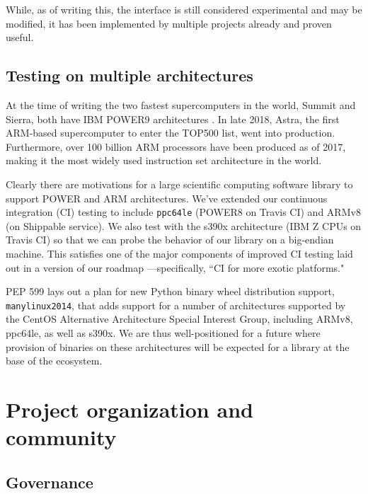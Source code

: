 \documentclass[fleqn,10pt]{wlscirep}
\begin{document}
While, as of writing this, the interface is still considered experimental
and may be modified, it has been implemented by multiple projects already
and proven useful.


\subsection*{Testing on multiple architectures}

At the time of writing the two fastest supercomputers in the
world, Summit and Sierra, both have IBM POWER9 architectures
\cite{top500nov2019}. In late 2018, Astra, the first ARM-based
supercomputer to enter the TOP500 list, went into production\cite{
astra-wiki}. Furthermore, over 100 billion ARM processors have been
produced as of 2017\cite{arm-architecture}, making it the most 
widely used instruction set architecture in the world.

Clearly there are motivations for a large scientific computing
software library to support POWER and ARM architectures. We've extended
our continuous integration (CI) testing to include \texttt{ppc64le}
(POWER8 on Travis CI) and ARMv8 (on Shippable service). We also test
with the s390x architecture (IBM Z CPUs on Travis CI) so that we
can probe the behavior of our library on a big-endian machine.
This satisfies one of the major components of
improved CI testing laid out in a version of our roadmap
\cite{numpy-roadmap}---specifically, ``CI for more exotic
platforms."

PEP 599\cite{PEP599} lays out a plan for new Python binary wheel
distribution support, \texttt{manylinux2014}, that adds
support for a number of architectures supported by the CentOS
Alternative Architecture Special Interest Group, including
ARMv8, ppc64le, as well as s390x. We are thus well-positioned
for a future where provision of binaries on these architectures
will be expected for a library at the base of the ecosystem.

\section*{Project organization and community}

\subsection*{Governance}
\end{document}
